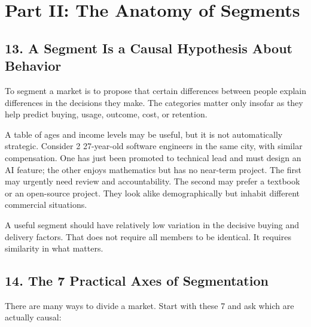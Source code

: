 \section*{Part II: The Anatomy of Segments}

\subsection*{13. A Segment Is a Causal Hypothesis About Behavior}

To segment a market is to propose that certain differences between people explain differences in the decisions they make. The categories matter only insofar as they help predict buying, usage, outcome, cost, or retention.

A table of ages and income levels may be useful, but it is not automatically strategic. Consider 2 27-year-old software engineers in the same city, with similar compensation. One has just been promoted to technical lead and must design an AI feature; the other enjoys mathematics but has no near-term project. The first may urgently need review and accountability. The second may prefer a textbook or an open-source project. They look alike demographically but inhabit different commercial situations.

A useful segment should have relatively low variation in the decisive buying and delivery factors. That does not require all members to be identical. It requires similarity in what matters.

\subsection*{14. The 7 Practical Axes of Segmentation}

There are many ways to divide a market. Start with these 7 and ask which are actually causal:

